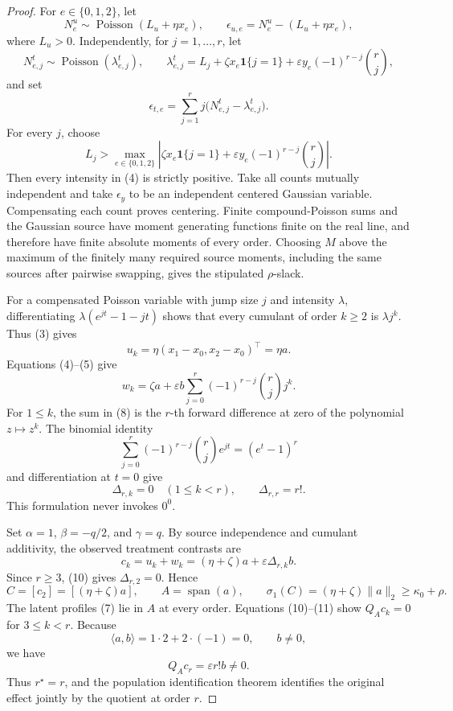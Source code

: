 \documentclass{article}
\begin{document}
\begin{proof}
For \(e\in\{0,1,2\}\), let
\[
 N^u_e\sim\operatorname{Poisson}(L_u+\eta x_e),
 \qquad
 \epsilon_{u,e}=N^u_e-(L_u+\eta x_e),                                    \tag{3}
\]
where \(L_u>0\).  Independently, for \(j=1,\ldots,r\), let
\[
 N^t_{e,j}\sim\operatorname{Poisson}(\lambda_{e,j}^t),
 \qquad
 \lambda_{e,j}^t
 =L_j+\zeta x_e\mathbf 1\{j=1\}
   +\varepsilon y_e(-1)^{r-j}\binom rj,                                  \tag{4}
\]
and set
\[
 \epsilon_{t,e}=\sum_{j=1}^r j\bigl(N^t_{e,j}-\lambda_{e,j}^t\bigr).      \tag{5}
\]
For every \(j\), choose
\[
 L_j>\max_{e\in\{0,1,2\}}
 \left|\zeta x_e\mathbf 1\{j=1\}
   +\varepsilon y_e(-1)^{r-j}\binom rj\right|.                           \tag{6}
\]
Then every intensity in (4) is strictly positive.  Take all counts mutually independent and take \(\epsilon_y\) to be an independent centered Gaussian variable.  Compensating each count proves centering.  Finite compound-Poisson sums and the Gaussian source have moment generating functions finite on the real line, and therefore have finite absolute moments of every order.  Choosing \(M\) above the maximum of the finitely many required source moments, including the same sources after pairwise swapping, gives the stipulated \(\rho\)-slack.

For a compensated Poisson variable with jump size \(j\) and intensity \(\lambda\), differentiating \(\lambda(e^{jt}-1-jt)\) shows that every cumulant of order \(k\geq2\) is \(\lambda j^k\).  Thus (3) gives
\[
 u_k=\eta(x_1-x_0,x_2-x_0)^\top=\eta a.                                  \tag{7}
\]
Equations (4)--(5) give
\[
 w_k=\zeta a+\varepsilon b
       \sum_{j=0}^r(-1)^{r-j}\binom rj j^k.                              \tag{8}
\]
For \(1\leq k\), the sum in (8) is the \(r\)-th forward difference at zero of the polynomial \(z\mapsto z^k\).  The binomial identity
\[
 \sum_{j=0}^r(-1)^{r-j}\binom rj e^{jt}=(e^t-1)^r                        \tag{9}
\]
and differentiation at \(t=0\) give
\[
 \Delta_{r,k}=0\quad(1\leq k<r),
 \qquad \Delta_{r,r}=r!.                                                  \tag{10}
\]
This formulation never invokes \(0^0\).

Set \(\alpha=1\), \(\beta=-q/2\), and \(\gamma=q\).  By source independence and cumulant additivity, the observed treatment contrasts are
\[
 c_k=u_k+w_k=(\eta+\zeta)a+\varepsilon\Delta_{r,k}b.                      \tag{11}
\]
Since \(r\geq3\), (10) gives \(\Delta_{r,2}=0\).  Hence
\[
 C=[c_2]=[(\eta+\zeta)a],
 \qquad A=\operatorname{span}(a),
 \qquad \sigma_1(C)=(\eta+\zeta)\|a\|_2\geq\kappa_0+\rho.             \tag{12}
\]
The latent profiles (7) lie in \(A\) at every order.  Equations (10)--(11) show \(Q_Ac_k=0\) for \(3\leq k<r\).  Because
\[
 \langle a,b\rangle=1\cdot2+2\cdot(-1)=0,
 \qquad b\neq0,                                                           \tag{13}
\]
we have
\[
 Q_Ac_r=\varepsilon r!b\neq0.                                             \tag{14}
\]
Thus \(r^\star=r\), and the population identification theorem identifies the original effect jointly by the quotient at order \(r\).


\end{proof}
\end{document}
